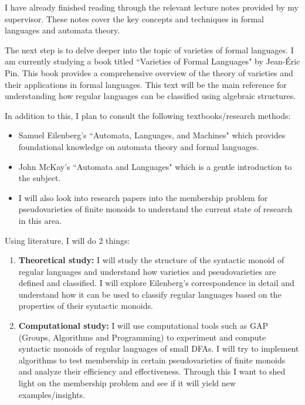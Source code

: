 I have already finished reading through the relevant lecture notes provided by my supervisor. These notes cover the key concepts and techniques in formal languages and automata theory.

The next step is to delve deeper into the topic of varieties of formal languages. I am currently studying a book titled ``Varieties of Formal Languages" by Jean-Éric Pin. This book provides a comprehensive overview of the theory of varieties and their applications in formal languages.
This text will be the main reference for understanding how regular languages can be classified using algebraic structures.

In addition to this, I plan to consult the following textbooks/research methods:
\begin{itemize}
    \item Samuel Eilenberg's ``Automata, Languages, and Machines" which provides foundational knowledge on automata theory and formal languages.
    \item John McKay's ``Automata and Languages" which is a gentle introduction to the subject.
    \item I will also look into research papers into the membership problem for pseudovarieties of finite monoids to understand the current state of research in this area.
\end{itemize}

Using literature, I will do 2 things:

\begin{enumerate}
    \item {\bf Theoretical study:} I will study the structure of the syntactic monoid of regular languages and understand how varieties and pseudovarieties are defined and classified. I will explore Eilenberg's correspondence in detail and understand how it can be used to classify regular languages based on the properties of their syntactic monoids.
    \item {\bf Computational study:} I will use computational tools such as GAP (Groups, Algorithms and Programming) to experiment and compute syntactic monoids of regular languages of small DFAs. I will try to implement algorithms to test membership in certain pseudovarieties of finite monoids and analyze their efficiency and effectiveness. Through this I want to shed light on the membership problem and see if it will yield new examples/insights.
\end{enumerate}